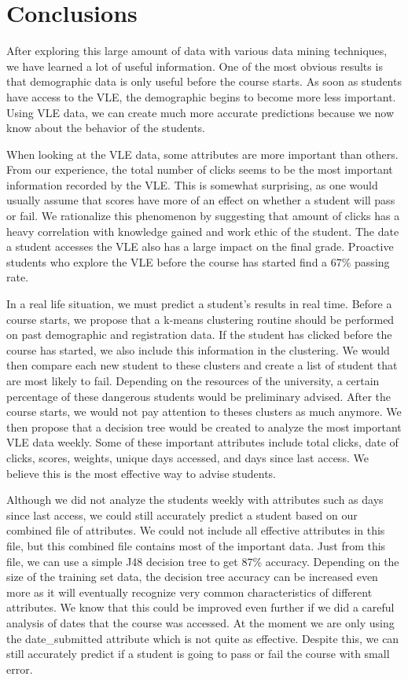 \documentclass[12pt]{article}
\begin{document}
 
\clearpage
\section{Conclusions}

After exploring this large amount of data with various data mining techniques, we have learned a lot of useful information. One of the most obvious results is that demographic data is only useful before the course starts. As soon as students have access to the VLE, the demographic begins to become more less important. Using VLE data, we can create much more accurate predictions because we now know about the behavior of the students. 

When looking at the VLE data, some attributes are more important than others. From our experience, the total number of clicks seems to be the most important information recorded by the VLE. This is somewhat surprising, as one would usually assume that scores have more of an effect on whether a student will pass or fail. We rationalize this phenomenon by suggesting that amount of clicks has a heavy correlation with knowledge gained and work ethic of the student. The date a student accesses the VLE also has a large impact on the final grade. Proactive students who explore the VLE before the course has started find a 67\% passing rate. 

In a real life situation, we must predict a student's results in real time. Before a course starts, we propose that a k-means clustering routine should be performed on past demographic and registration data. If the student has clicked before the course has started, we also include this information in the clustering. We would then compare each new student to these clusters and create a list of student that are most likely to fail. Depending on the resources of the university, a certain percentage of these dangerous students would be preliminary advised. After the course starts, we would not pay attention to theses clusters as much anymore. We then propose that a decision tree would be created to analyze the most important VLE data weekly. Some of these important attributes include total clicks, date of clicks, scores, weights, unique days accessed, and days since last access. We believe this is the most effective way to advise students.

Although we did not analyze the students weekly with attributes such as days since last access, we could still accurately predict a student based on our combined file of attributes. We could not include all effective attributes in this file, but this combined file contains most of the important data. Just from this file, we can use a simple J48 decision tree to get 87\% accuracy. Depending on the size of the training set data, the decision tree accuracy can be increased even more as it will eventually recognize very common characteristics of different attributes. We know that this could be improved even further if we did a careful analysis of dates that the course was accessed. At the moment we are only using the date\_submitted attribute which is not quite as effective. Despite this, we can still accurately predict if a student is going to pass or fail the course with small error.
\end{document}
